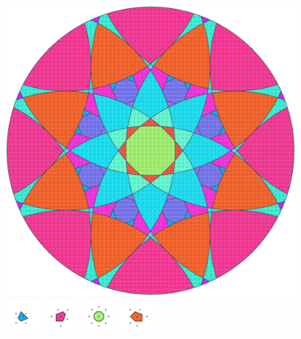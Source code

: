 \documentclass[text.tex]{subfiles}
\begin{document}
\clearpage
\pagestyle{fancy}
\fancyhf{}
\begin{figure}[h!]
\centering
\includegraphics[width=1\textwidth]{img/results/circle8/circle8_120710_(0_1alpha_2).pdf}
\includegraphics[width=0.12\textwidth]{img/results/circle8/circle8_120710_(0_1alpha_2)_001.pdf}
\includegraphics[width=0.12\textwidth]{img/results/circle8/circle8_120710_(0_1alpha_2)_002.pdf}
\includegraphics[width=0.12\textwidth]{img/results/circle8/circle8_120710_(0_1alpha_2)_003.pdf}
\includegraphics[width=0.12\textwidth]{img/results/circle8/circle8_120710_(0_1alpha_2)_004.pdf}

\end{figure}
\end{document}
